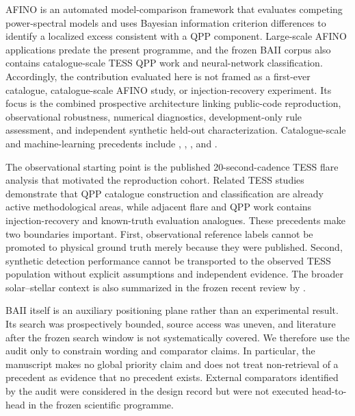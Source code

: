 \documentclass[11pt,a4paper]{article}
\begin{document}
AFINO is an automated model-comparison framework that evaluates competing power-spectral models and uses Bayesian information criterion differences to identify a localized excess consistent with a QPP component. Large-scale AFINO applications predate the present programme, and the frozen BAII corpus also contains catalogue-scale TESS QPP work and neural-network classification. Accordingly, the contribution evaluated here is not framed as a first-ever catalogue, catalogue-scale AFINO study, or injection-recovery experiment. Its focus is the combined prospective architecture linking public-code reproduction, observational robustness, numerical diagnostics, development-only rule assessment, and independent synthetic held-out characterization. Catalogue-scale and machine-learning precedents include \citet{HowardMacGregor2022}, \citet{Belov2024}, \citet{Joshi2025}, and \citet{Wang2025}.

The observational starting point is the published 20-second-cadence TESS flare analysis that motivated the reproduction cohort. Related TESS studies demonstrate that QPP catalogue construction and classification are already active methodological areas, while adjacent flare and QPP work contains injection-recovery and known-truth evaluation analogues. These precedents make two boundaries important. First, observational reference labels cannot be promoted to physical ground truth merely because they were published. Second, synthetic detection performance cannot be transported to the observed TESS population without explicit assumptions and independent evidence. The broader solar--stellar context is also summarized in the frozen recent review by \citet{Reale2026}.

BAII itself is an auxiliary positioning plane rather than an experimental result. Its search was prospectively bounded, source access was uneven, and literature after the frozen search window is not systematically covered. We therefore use the audit only to constrain wording and comparator claims. In particular, the manuscript makes no global priority claim and does not treat non-retrieval of a precedent as evidence that no precedent exists. External comparators identified by the audit were considered in the design record but were not executed head-to-head in the frozen scientific programme.
\end{document}
